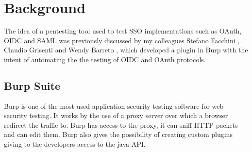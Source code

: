 \chapter{Background}
The idea of a pentesting tool used to test SSO implementations such as OAuth, OIDC and SAML was previously discussed by my colleagues Stefano Facchini \cite{stefano_faccini}, Claudio Grisenti \cite{claudio_grisenti} and Wendy Barreto \cite{wendy_barreto}, which developed a plugin in Burp with the intent of automating the the testing of OIDC and OAuth protocols.

\section{Burp Suite}
Burp is one of the most used application security testing software for web security testing. It works by the use of a proxy server over which a browser redirect the traffic to. Burp has access to the proxy, it can sniff HTTP packets and can edit them. Burp also gives the possibility of creating custom plugins giving to the developers access to the java API.


